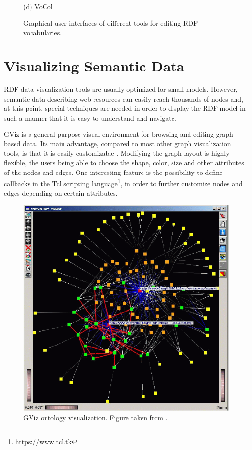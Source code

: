 \begin{figure}[htb]
\begin{minipage}[b]{0.48\linewidth}
  \centerline{(d) VoCol}\medskip
\end{minipage}
%
\caption{Graphical user interfaces of different tools for editing RDF vocabularies.}
\label{img:tools}
%
\end{figure}


\section{Visualizing Semantic Data}
\label{sec:visualizing_semantic_data}

RDF data visualization tools are usually optimized for small models. However, semantic data describing web resources can easily reach thousands of nodes and, at this point, special techniques are needed in order to display the RDF model in such a manner that it is easy to understand and navigate.

GViz \cite{Telea2002} is a general purpose visual environment for browsing and editing graph-based data. Its main advantage, compared to most other graph visualization tools, is that it is easily customizable \cite{Telea2003}. Modifying the graph layout is highly flexible, the users being able to choose the shape, color, size and other attributes of the nodes and edges. One interesting feature is the possibility to define callbacks in the Tcl scripting language\footnote{\url{https://www.tcl.tk}}, in order to further customize nodes and edges depending on certain attributes. 

\begin{figure}[!htbp]
	\centering
 	\centerline{\includegraphics[width=0.7\linewidth]{img/gviz.png}}
	\caption{GViz ontology visualization. Figure taken from \cite{Telea2003}.}
	\label{img:gviz}
\end{figure}

